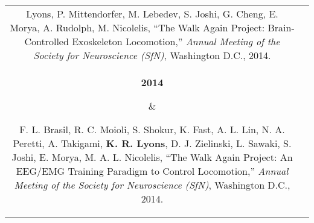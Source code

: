 \documentclass[10pt]{article}
\newcommand\LColRaw[3]{\parbox[t]{#1}{
    \raggedleft%
    {\bf#2}\\
    {\small\color{gray}#3}}
}
\newcommand\LCol[2]{\LColRaw{1.3in}{#1}{#2}}
\newcommand\RCol[1]{\parbox[t]{6.0in}{#1}}
\begin{document}
\begin{longtable}{cc}
{{            Lyons}, P. Mittendorfer, M. Lebedev, S. Joshi, G. Cheng, E. Morya,
            A. Rudolph, M. Nicolelis,
        ``The Walk Again Project: Brain-Controlled Exoskeleton Locomotion,''
        \emph{Annual Meeting of the Society for Neuroscience (SfN)},
        Washington D.C.,
        2014.}\\
    \LCol{2014}{} & \RCol{%
        F. L. Brasil, R. C. Moioli, S. Shokur, K. Fast, A. L. Lin, N. A.
            Peretti, A. Takigami, \textbf{K. R. Lyons}, D. J. Zielinski, L.
            Sawaki, S. Joshi, E. Morya, M. A. L. Nicolelis,
        ``The Walk Again Project: An EEG/EMG Training Paradigm to Control
            Locomotion,''
        \emph{Annual Meeting of the Society for Neuroscience (SfN)},
        Washington D.C.,
        2014.}
\end{longtable}
\end{document}

